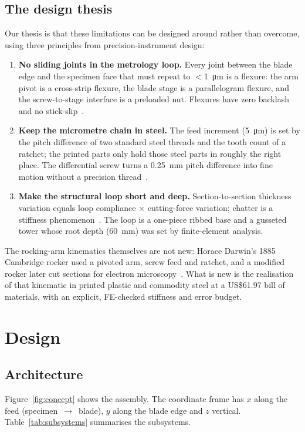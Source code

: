 \documentclass[11pt,a4paper]{article}
\begin{document}
\subsection{The design thesis}
Our thesis is that these limitations can be designed around rather than overcome, using three principles from precision-instrument design:
\begin{enumerate}[nosep]
\item \textbf{No sliding joints in the metrology loop.} Every joint between the blade edge and the specimen face that must repeat to $<$\SI{1}{\micro\metre} is a flexure: the arm pivot is a cross-strip flexure, the blade stage is a parallelogram flexure, and the screw-to-stage interface is a preloaded nut. Flexures have zero backlash and no stick-slip~\citep{Smith2000,Wittrick1948}.
\item \textbf{Keep the micrometre chain in steel.} The feed increment (\SI{5}{\micro\metre}) is set by the pitch difference of two standard steel threads and the tooth count of a ratchet; the printed parts only hold those steel parts in roughly the right place. The differential screw turns a \SI{0.25}{\milli\metre} pitch difference into fine motion without a precision thread~\citep{SmithChetwynd2017}.
\item \textbf{Make the structural loop short and deep.} Section-to-section thickness variation equals loop compliance $\times$ cutting-force variation; chatter is a stiffness phenomenon~\citep{Bayley1955,Warshawsky1983}. The loop is a one-piece ribbed base and a gusseted tower whose root depth (\SI{60}{\milli\metre}) was set by finite-element analysis.
\end{enumerate}
The rocking-arm kinematics themselves are not new: Horace Darwin's 1885 Cambridge rocker used a pivoted arm, screw feed and ratchet, and a modified rocker later cut sections for electron microscopy~\citep{Eaves1954}. What is new is the realisation of that kinematic in printed plastic and commodity steel at a US\$61.97 bill of materials, with an explicit, FE-checked stiffness and error budget.

\FloatBarrier
\section{Design}
\subsection{Architecture}
Figure~\ref{fig:concept} shows the assembly. The coordinate frame has $x$ along the feed (specimen~$\rightarrow$~blade), $y$ along the blade edge and $z$ vertical. Table~\ref{tab:subsystems} summarises the subsystems.
\end{document}
